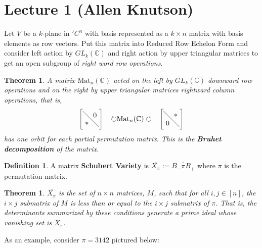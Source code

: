 \documentclass[12pt]{amsart}
\numberwithin{equation}{section}
\newtheorem{Theorem}[equation]{Theorem}
\theoremstyle{definition}
\newtheorem{Definition}[equation]{Definition}
\numberwithin{figure}{section}
\newcommand{\C}{\mathbb{C}}
\begin{document}
\section{Lecture 1 (Allen Knutson)}

Let $V$ be a $k$-plane in $'C^n$ with basis represented as a $k\times n$ matrix with basis elements as row vectors. Put this matrix into Reduced Row Echelon Form and consider left action by $GL_k(\C)$ and right action by upper triangular matrices to get an open subgroup of \textit{right word row operations}.

\begin{Theorem}
A matrix $\text{Mat}_n(\C)$ acted on the left by $GL_k(\C)$ downward row operations and  on the right by upper triangular matrices rightward column operations, that is,
$$\begin{tikzpicture}
\node (a) at (.3,.3) {$*$};
\node (b) at (.7,.7) {$0$};
\draw [-] (.9,.1) to (.1,.9);
\draw[-] (0,0) to (0,1);
\draw[-] (1,0) to (1,1);
\draw[-] (0,0) to (.1,0);
\draw[-] (0,1) to (.1,1);
\draw[-] (.9,0) to (1,0);
\draw[-] (.9,1) to (1,1);
\node (c) at (2.5,.5) {$\circlearrowright$Mat$_n(\C)\circlearrowleft$};
\node (a) at (4.3,.3) {$0$};
\node (b) at (4.7,.7) {$*$};
\draw [-] (4.9,.1) to (4.1,.9);
\draw[-] (4,0) to (4,1);
\draw[-] (5,0) to (5,1);
\draw[-] (4,0) to (4.1,0);
\draw[-] (4,1) to (4.1,1);
\draw[-] (4.9,0) to (5,0);
\draw[-] (4.9,1) to (5,1);
\end{tikzpicture}$$
 has one orbit for each partial permutation matrix. This is the \textbf{Bruhet decomposition} of the matrix.
\end{Theorem}

\begin{Definition}
A matrix \textbf{Schubert Variety} is $\overline{X_{\pi}}:=\overline{B_-\pi B_+}$ where $\pi$ is the permutation matrix.
\end{Definition}

\begin{Theorem}
$\overline{X_\pi}$ is the set of $n\times n$ matrices, $M$, such that for all $i,j\in[n]$, the $i\times j$ submatrix of $M$ is less than or equal to the $i\times j$ submatrix of $\pi$. That is, the determinants summarized by these conditions generate a prime ideal whose vanishing set is $\overline{X_\pi}$.
\end{Theorem}

As an example, consider $\pi=3142$ pictured below:
\end{document}
